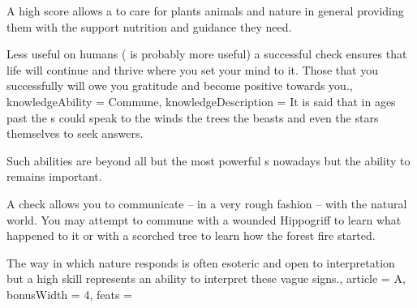 {A high  score allows a \bname{} to care for plants\comma{} animals and nature in general\comma{} providing them with the support\comma{} nutrition and guidance they need.

Less useful on humans ( is probably more useful)\comma{} a successful  check ensures that life will continue and thrive where you set your mind to it. Those that you successfully  will owe you gratitude and become positive towards you.,
	knowledgeAbility = Commune,
	knowledgeDescription = It is said that\comma{} in ages past\comma{} the \bname{}s could speak to the winds\comma{} the trees\comma{} the beasts and even the stars themselves to seek answers. 

Such abilities are beyond all but the most powerful \bname{}s nowadays\comma{} but the ability to  remains important. 

A  check allows you to communicate – in a very rough fashion – with the natural world. You may attempt to commune with a wounded Hippogriff to learn what happened to it\comma{} or with a scorched tree to learn how the forest fire started. 

The way in which nature responds is often esoteric and open to interpretation\comma{} but a high  skill represents an ability to interpret these vague signs.,
	article = A,
	bonusWidth = 4, feats = \DruidFeats
}

